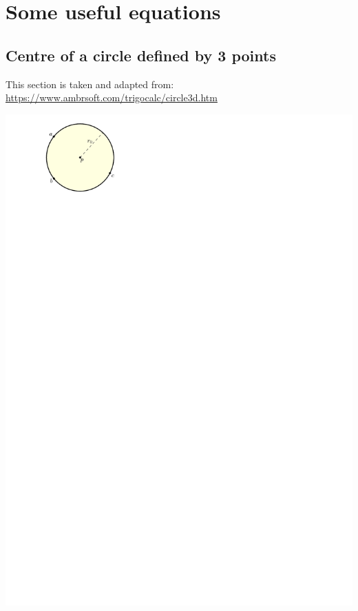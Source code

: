 
\graphicspath{{appendices/equations/figs/}}

\chapter{Some useful equations}%
\label{app:equations}

%
\section{Centre of a circle defined by 3 points}%
\label{sec:centrecircle}



\begin{kaobox-info}
  This section is taken and adapted from:
  \\
  \url{https://www.ambrsoft.com/trigocalc/circle3d.htm}
\end{kaobox-info}


\begin{marginfigure}
  \centering
  \includegraphics[width=\linewidth]{circle.pdf}
\end{marginfigure}


